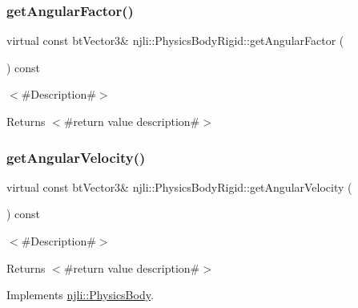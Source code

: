 \subsubsection{\texorpdfstring{get\+Angular\+Factor()}{getAngularFactor()}}
{\footnotesize\ttfamily virtual const bt\+Vector3\& njli\+::\+Physics\+Body\+Rigid\+::get\+Angular\+Factor (\begin{DoxyParamCaption}{ }\end{DoxyParamCaption}) const\hspace{0.3cm}{\ttfamily [virtual]}}

$<$\#\+Description\#$>$

\begin{DoxyReturn}{Returns}
$<$\#return value description\#$>$ 
\end{DoxyReturn}
\mbox{\label{classnjli_1_1_physics_body_rigid_a13bb91357c547d832411c02be5e89260}} 
\subsubsection{\texorpdfstring{get\+Angular\+Velocity()}{getAngularVelocity()}}
{\footnotesize\ttfamily virtual const bt\+Vector3\& njli\+::\+Physics\+Body\+Rigid\+::get\+Angular\+Velocity (\begin{DoxyParamCaption}{ }\end{DoxyParamCaption}) const\hspace{0.3cm}{\ttfamily [virtual]}}

$<$\#\+Description\#$>$

\begin{DoxyReturn}{Returns}
$<$\#return value description\#$>$ 
\end{DoxyReturn}


Implements \mbox{\hyperlink{classnjli_1_1_physics_body_a598de298accae3b59c821ab8e640d464}{njli\+::\+Physics\+Body}}.

\mbox{\label{classnjli_1_1_physics_body_rigid_a03cf3d38b4083b61dcffcb1a5327213d}} 
